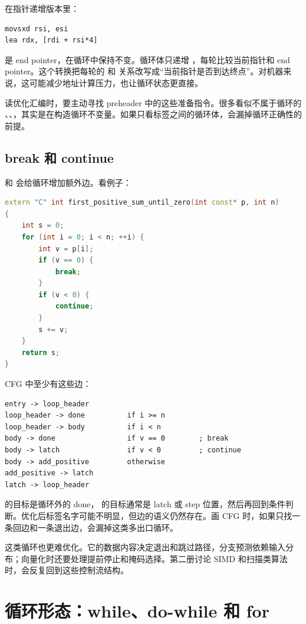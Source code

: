 在指针递增版本里：

\begin{lstlisting}
movsxd rsi, esi
lea rdx, [rdi + rsi*4]
\end{lstlisting}

 是 end pointer，在循环中保持不变。循环体只递增 ，每轮比较当前指针和 end pointer。这个转换把每轮的  和  关系改写成“当前指针是否到达终点”。对机器来说，这可能减少地址计算压力，也让循环状态更直接。

读优化汇编时，要主动寻找 preheader 中的这些准备指令。很多看似不属于循环的 、、，其实是在构造循环不变量。如果只看标签之间的循环体，会漏掉循环正确性的前提。

\subsection{break 和 continue}

 和  会给循环增加额外边。看例子：

\begin{lstlisting}[language=C++]
extern "C" int first_positive_sum_until_zero(int const* p, int n)
{
    int s = 0;
    for (int i = 0; i < n; ++i) {
        int v = p[i];
        if (v == 0) {
            break;
        }
        if (v < 0) {
            continue;
        }
        s += v;
    }
    return s;
}
\end{lstlisting}

CFG 中至少有这些边：

\begin{lstlisting}
entry -> loop_header
loop_header -> done          if i >= n
loop_header -> body          if i < n
body -> done                 if v == 0        ; break
body -> latch                if v < 0         ; continue
body -> add_positive         otherwise
add_positive -> latch
latch -> loop_header
\end{lstlisting}

 的目标是循环外的 done， 的目标通常是 latch 或 step 位置，然后再回到条件判断。优化后标签名字可能不明显，但边的语义仍然存在。画 CFG 时，如果只找一条回边和一条退出边，会漏掉这类多出口循环。

这类循环也更难优化。它的数据内容决定退出和跳过路径，分支预测依赖输入分布；向量化时还要处理提前停止和掩码选择。第二册讨论 SIMD 和扫描类算法时，会反复回到这些控制流结构。

\section{循环形态：while、do-while 和 for}


